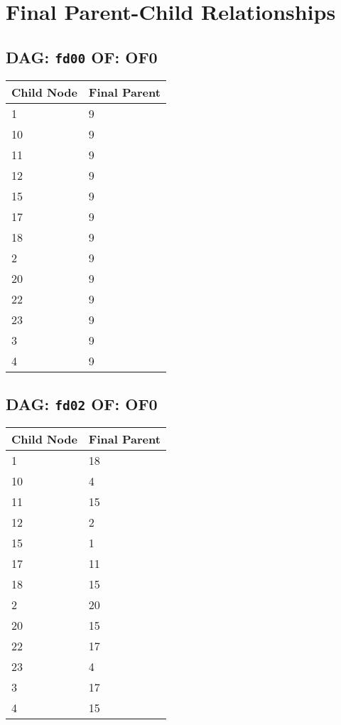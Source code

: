 \documentclass{article}
\begin{document}
\pagestyle{fancy}
\fancyhf{}
\section*{Final Parent-Child Relationships}
\subsection*{DAG: \texttt{fd00} OF: OF0}
\begin{tabular}{ll}
\toprule
\textbf{Child Node} & \textbf{Final Parent} \\
\midrule
1 & 9 \\
10 & 9 \\
11 & 9 \\
12 & 9 \\
15 & 9 \\
17 & 9 \\
18 & 9 \\
2 & 9 \\
20 & 9 \\
22 & 9 \\
23 & 9 \\
3 & 9 \\
4 & 9 \\
\bottomrule
\end{tabular}

\subsection*{DAG: \texttt{fd02} OF: OF0}
\begin{tabular}{ll}
\toprule
\textbf{Child Node} & \textbf{Final Parent} \\
\midrule
1 & 18 \\
10 & 4 \\
11 & 15 \\
12 & 2 \\
15 & 1 \\
17 & 11 \\
18 & 15 \\
2 & 20 \\
20 & 15 \\
22 & 17 \\
23 & 4 \\
3 & 17 \\
4 & 15 \\
\bottomrule
\end{tabular}
\end{document}
